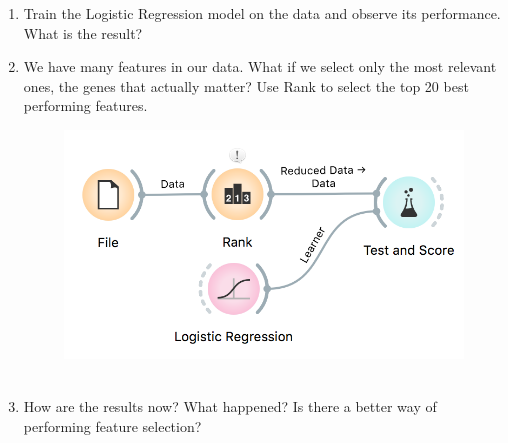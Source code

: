 \begin{enumerate}
    \item Train the Logistic Regression model on the data and observe its performance. What is the result?
    \item We have many features in our data. What if we select only the most relevant ones, the genes that actually matter? Use Rank to select the top 20 best performing features.
    
    \begin{figure}[h]
        \centering
        \includegraphics[scale=0.7]{overfitting2.png}%
        \caption{$\;$}
        \label{fig:wf2}
      \end{figure}

    \item How are the results now? What happened? Is there a better way of performing feature selection?
\end{enumerate}
